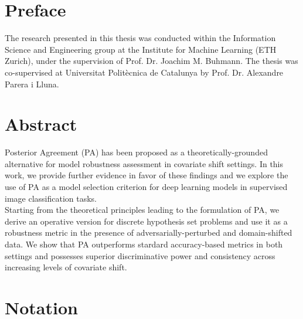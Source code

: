 
\chapter*{Preface}

The research presented in this thesis was conducted within the Information Science and Engineering 
group at the Institute for Machine Learning (ETH Zurich), under the supervision of 
Prof. Dr. Joachim M. Buhmann. The thesis was co-supervised at Universitat Polit\`ecnica 
de Catalunya by Prof. Dr. Alexandre Parera i Lluna.

 \cleardoublepage


 \setcounter{tocdepth}{2}
 \tableofcontents

 \cleardoublepage


\chapter*{Abstract}

 Posterior Agreement (PA) has been proposed as a theoretically-grounded alternative 
 for model robustness assessment in covariate shift settings. In this work, we provide 
 further evidence in favor of these findings and we explore the use of PA as a model 
 selection criterion for deep learning models in supervised image classification tasks. \\
 
 Starting from the theoretical principles leading to the formulation of PA, we derive an
 operative version for discrete hypothesis set problems and use it as a robustness metric 
 in the presence of adversarially-perturbed and domain-shifted data. We show that PA outperforms 
 stardard accuracy-based metrics in both settings and possesses superior discriminative 
 power and consistency across increasing levels of covariate shift. \\

 \cleardoublepage



\chapter*{Notation}\label{chap:symbole}

